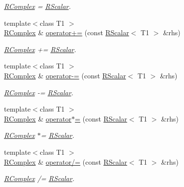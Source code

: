\begin{DoxyCompactItemize}
\begin{DoxyCompactList}\small\item\em \mbox{\hyperlink{classENSEM_1_1RComplex}{R\+Complex}} = \mbox{\hyperlink{classENSEM_1_1RScalar}{R\+Scalar}}. \end{DoxyCompactList}\item 
{\footnotesize template$<$class T1 $>$ }\\\mbox{\hyperlink{classENSEM_1_1RComplex}{R\+Complex}} \& \mbox{\hyperlink{classENSEM_1_1RComplex_a0a7beaab81b8f5e2129a4c7b1074f85c}{operator+=}} (const \mbox{\hyperlink{classENSEM_1_1RScalar}{R\+Scalar}}$<$ T1 $>$ \&rhs)
\begin{DoxyCompactList}\small\item\em \mbox{\hyperlink{classENSEM_1_1RComplex}{R\+Complex}} += \mbox{\hyperlink{classENSEM_1_1RScalar}{R\+Scalar}}. \end{DoxyCompactList}\item 
{\footnotesize template$<$class T1 $>$ }\\\mbox{\hyperlink{classENSEM_1_1RComplex}{R\+Complex}} \& \mbox{\hyperlink{classENSEM_1_1RComplex_af071c8c8f4d2a2cf17a9e4b01accf6bc}{operator-\/=}} (const \mbox{\hyperlink{classENSEM_1_1RScalar}{R\+Scalar}}$<$ T1 $>$ \&rhs)
\begin{DoxyCompactList}\small\item\em \mbox{\hyperlink{classENSEM_1_1RComplex}{R\+Complex}} -\/= \mbox{\hyperlink{classENSEM_1_1RScalar}{R\+Scalar}}. \end{DoxyCompactList}\item 
{\footnotesize template$<$class T1 $>$ }\\\mbox{\hyperlink{classENSEM_1_1RComplex}{R\+Complex}} \& \mbox{\hyperlink{classENSEM_1_1RComplex_aaf2adc526cdbb0b29931b21311cd74fe}{operator$\ast$=}} (const \mbox{\hyperlink{classENSEM_1_1RScalar}{R\+Scalar}}$<$ T1 $>$ \&rhs)
\begin{DoxyCompactList}\small\item\em \mbox{\hyperlink{classENSEM_1_1RComplex}{R\+Complex}} $\ast$= \mbox{\hyperlink{classENSEM_1_1RScalar}{R\+Scalar}}. \end{DoxyCompactList}\item 
{\footnotesize template$<$class T1 $>$ }\\\mbox{\hyperlink{classENSEM_1_1RComplex}{R\+Complex}} \& \mbox{\hyperlink{classENSEM_1_1RComplex_ace62972244741ac0abcf1d3d1e833604}{operator/=}} (const \mbox{\hyperlink{classENSEM_1_1RScalar}{R\+Scalar}}$<$ T1 $>$ \&rhs)
\begin{DoxyCompactList}\small\item\em \mbox{\hyperlink{classENSEM_1_1RComplex}{R\+Complex}} /= \mbox{\hyperlink{classENSEM_1_1RScalar}{R\+Scalar}}. \end{DoxyCompactList}\item 

\end{DoxyCompactItemize}
